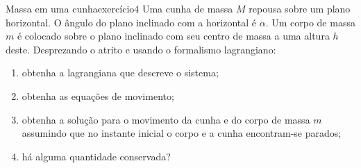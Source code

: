 \begin{exercício}{Massa em uma cunha}{exercício4}
    Uma cunha de massa \(M\) repousa sobre um plano horizontal. O ângulo do plano inclinado com a horizontal é \(\alpha\). Um corpo de massa \(m\) é colocado sobre o plano inclinado com seu centro de massa a uma altura \(h\) deste. Desprezando o atrito e usando o formalismo lagrangiano:
    \begin{enumerate}[label=(\alph*)]
        \item obtenha a lagrangiana que descreve o sistema;
        \item obtenha as equações de movimento;
        \item obtenha a solução para o movimento da cunha e do corpo de massa \(m\) assumindo que no instante inicial o corpo e a cunha encontram-se parados;
        \item há alguma quantidade conservada?
    \end{enumerate}
\end{exercício}
